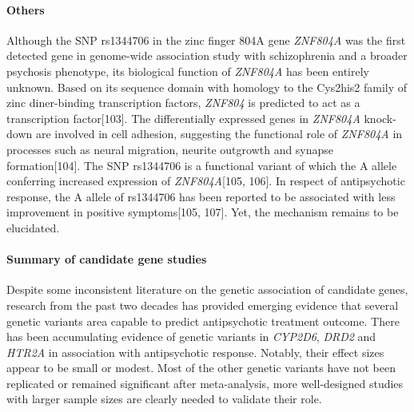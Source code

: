 \documentclass[12pt]{report}
\newcommand{\gene}[1]{\textit{#1}}
\begin{document}
			\paragraph{Others}
				Although the SNP rs1344706 in the zinc finger 804A gene \gene{ZNF804A} was the first detected gene in genome-wide association study with schizophrenia and a broader psychosis phenotype, its biological function of \gene{ZNF804A} has been entirely unknown. 
				Based on its sequence domain with homology to the Cys2his2 family of zinc diner-binding transcription factors, \gene{ZNF804} is predicted to act as a transcription factor[103]. 
				The differentially expressed genes in \gene{ZNF804A} knock-down are involved in cell adhesion, suggesting the functional role of \gene{ZNF804A} in processes such as neural migration, neurite outgrowth and synapse formation[104]. 
				The SNP rs1344706 is a functional variant of which the A allele conferring increased expression of \gene{ZNF804A}[105, 106]. 
				In respect of antipsychotic response, the A allele of rs1344706 has been reported to be associated with less improvement in positive symptoms[105, 107]. 
				Yet, the mechanism remains to be elucidated. 
			\paragraph{Summary of candidate gene studies}
				Despite some inconsistent literature on the genetic association of candidate genes, research from the past two decades has provided emerging evidence that several genetic variants area capable to predict antipsychotic treatment outcome. 
				There has been accumulating evidence of genetic variants in \gene{CYP2D6}, \gene{DRD2} and \gene{HTR2A} in association with antipsychotic response. 
				Notably, their effect sizes appear to be small or modest.
				Most of the other genetic variants have not been replicated or remained significant after meta-analysis, more well-designed studies with larger sample sizes are clearly needed to validate their role.  
				
\end{document}
